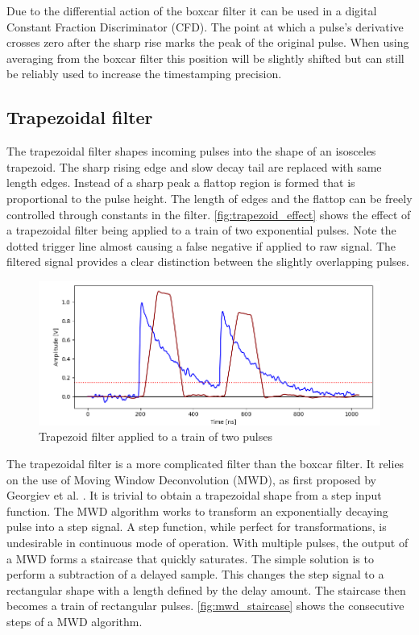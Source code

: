 Due to the differential action of the boxcar filter it can be used in a
digital Constant Fraction Discriminator (CFD).
The point at which a pulse's derivative crosses zero after 
the sharp rise marks the peak of the original pulse. 
When using averaging from the boxcar filter this position 
will be slightly shifted but can still be reliably used to increase
the timestamping precision.

\subsection{Trapezoidal filter} \label{ssec:trapezoidal_filter}

The trapezoidal filter shapes incoming pulses into the 
shape of an isosceles trapezoid. The sharp rising edge and 
slow decay tail are replaced with same length edges.
Instead of a sharp peak a flattop region is formed that is proportional
to the pulse height. The length of edges and the flattop can be freely
controlled through constants in the filter. \autoref{fig:trapezoid_effect}
shows the effect of a trapezoidal filter being applied to a train
of two exponential pulses. Note the dotted trigger line almost 
causing a false negative if applied to raw signal. 
The filtered signal provides a clear distinction 
between the slightly overlapping pulses.

\begin{figure}[H]
  \centering
  \includegraphics[width=\linewidth]{media/trapezoid_effect.png}
  \caption{Trapezoid filter applied to a train of two pulses}
  \label{fig:trapezoid_effect} 
\end{figure}


The trapezoidal filter is a more complicated filter than the boxcar filter.
It relies on the use of Moving Window Deconvolution (MWD),
as first proposed by Georgiev et al. \cite{mwd}.
It is trivial to obtain a trapezoidal shape from a step input function.
The MWD algorithm works to transform an exponentially decaying pulse into 
a step signal. A step function, while perfect for transformations,
is undesirable in continuous mode of operation.
With multiple pulses, the output of a MWD forms a staircase that quickly saturates.
The simple solution is to perform a subtraction of a delayed sample.
This changes the step signal
to a rectangular shape with a length defined by the delay amount.
The staircase then becomes a train of rectangular pulses.
\autoref{fig:mwd_staircase} shows the consecutive steps of a MWD algorithm.

